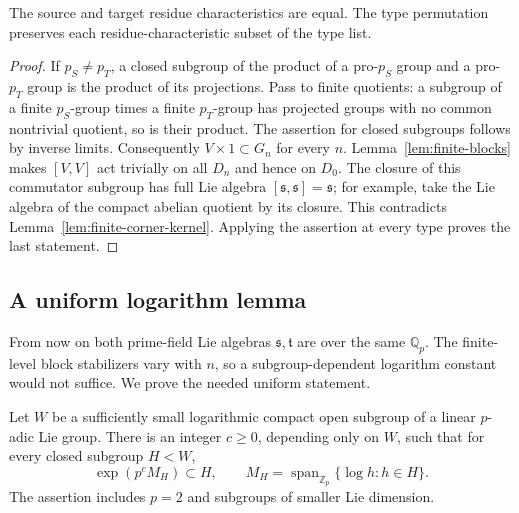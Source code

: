 \begin{corollary}
\label{cor:finite-primes}
The source and target residue characteristics are equal.  The type
permutation preserves each residue-characteristic subset of the type
list.
\end{corollary}

\begin{proof}
If $p_S\ne p_T$, a closed subgroup of the product of a pro-$p_S$
group and a pro-$p_T$ group is the product of its projections.
Pass to finite quotients: a subgroup of a finite $p_S$-group times
a finite $p_T$-group has projected groups with no common nontrivial
quotient, so is their product.  The assertion for closed subgroups
follows by inverse limits.  Consequently $V\times1\subset G_n$ for
every $n$.  Lemma~\ref{lem:finite-blocks} makes $[V,V]$ act
trivially on all $D_n$ and hence on $D_0$.
The closure of this commutator subgroup has full Lie algebra
$[\mathfrak s,\mathfrak s]=\mathfrak s$; for example, take the
Lie algebra of the compact abelian quotient by its closure.
This contradicts Lemma~\ref{lem:finite-corner-kernel}.
Applying the assertion at every type proves the last statement.
\end{proof}

\subsection{A uniform logarithm lemma}

From now on both prime-field Lie algebras $\mathfrak s,\mathfrak t$
are over the same $\mathbb Q_p$.  The finite-level block stabilizers
vary with $n$, so a subgroup-dependent logarithm constant would not
suffice.  We prove the needed uniform statement.

\begin{lemma}
\label{lem:finite-uniform-log}
Let $W$ be a sufficiently small logarithmic compact open subgroup
of a linear $p$-adic Lie group.  There is an integer $c\geq0$,
depending only on $W$, such that for every closed subgroup $H<W$,
\begin{equation}
 \exp(p^cM_H)\subset H,\qquad
 M_H=\operatorname{span}_{\mathbb Z_p}\{\log h:h\in H\}.
 \label{eq:finite-uniform-log}
\end{equation}
The assertion includes $p=2$ and subgroups of smaller Lie dimension.
\end{lemma}

